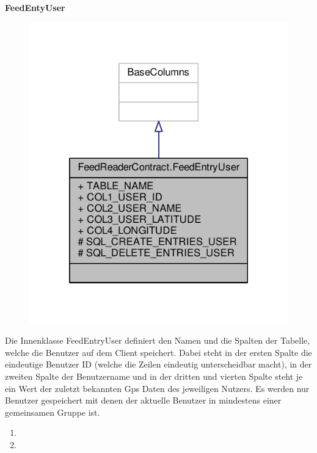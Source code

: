 \textbf{FeedEntyUser}
\begin{figure}[H]
	\includegraphics[scale = 1]{res/umlClasses/feed_reader_contract_user.pdf}
	\centering
\end{figure}
Die Innenklasse FeedEntryUser definiert den Namen und die Spalten der Tabelle, welche die Benutzer auf dem Client speichert. 
Dabei steht in der ersten Spalte die eindeutige Benutzer ID (welche die Zeilen eindeutig unterscheidbar macht), in der zweiten Spalte der Benutzername und in der dritten und vierten Spalte steht je ein Wert der zuletzt bekannten Gps Daten des jeweiligen Nutzers. 
Es werden nur Benutzer gespeichert mit denen der aktuelle Benutzer in mindestens einer gemeinsamen Gruppe ist.
\begin{enumerate}
	\item
	\item
\end{enumerate}


